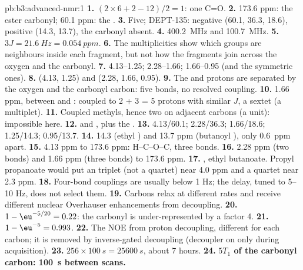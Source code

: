 \begin{solution}{pb:b3:advanced-nmr:1}
\textbf{1.} $(2 \times 6 + 2 - 12)/2 = 1$: one C=O.
\textbf{2.} 173.6 ppm: the ester carbonyl; 60.1 ppm: the .
\textbf{3.} Five; DEPT-135:  negative (60.1, 36.3, 18.6),  positive (14.3,
13.7), the carbonyl absent.
\textbf{4.} \qty{400.2}{MHz} and \qty{100.7}{MHz}.
\textbf{5.} $3J = \qty{21.6}{Hz} = \qty{0.054}{ppm}$.
\textbf{6.} The multiplicities show which groups are neighbours inside each
fragment, but not how the fragments join across the oxygen and the carbonyl.
\textbf{7.} 4.13--1.25; 2.28--1.66; 1.66--0.95 (and the symmetric ones).
\textbf{8.}  (4.13, 1.25) and  (2.28, 1.66, 0.95).
\textbf{9.} The  and  protons are separated by the oxygen and the
carbonyl carbon: five bonds, no resolved coupling.
\textbf{10.} 1.66 ppm, between  and : coupled to 2 + 3 = 5 protons with
similar $J$, a sextet (a multiplet).
\textbf{11.} Coupled methyls, hence two  on adjacent carbons (a  unit): impossible here.
\textbf{12.}  and , plus the .
\textbf{13.} 4.13/60.1; 2.28/36.3; 1.66/18.6; 1.25/14.3; 0.95/13.7.
\textbf{14.} 14.3 (ethyl ) and 13.7 ppm (butanoyl ), only \qty{0.6}{ppm} apart.
\textbf{15.} 4.13 ppm to 173.6 ppm: H--C--O--C, three bonds.
\textbf{16.} 2.28 ppm (two bonds) and 1.66 ppm (three bonds) to 173.6 ppm.
\textbf{17.} , ethyl butanoate. Propyl propanoate would put an
 triplet (not a quartet) near 4.0 ppm and a quartet near 2.3 ppm.
\textbf{18.} Four-bond couplings are usually below 1 Hz; the  delay, tuned to
5--10 Hz, does not select them.
\textbf{19.} Carbons relax at different rates and receive different nuclear
Overhauser enhancements from decoupling.
\textbf{20.} $1 - \eu^{-5/20} = 0.22$: the carbonyl is under-represented by a factor 4.
\textbf{21.} $1 - \eu^{-5} = 0.993$.
\textbf{22.} The NOE from proton decoupling, different for each carbon; it is removed
by inverse-gated decoupling (decoupler on only during acquisition).
\textbf{23.} $256 \times \qty{100}{s} = \qty{25600}{s}$, about 7 hours.
\textbf{24.} \textbf{$5T_1$ of the carbonyl carbon: \qty{100}{s} between scans.}
\end{solution}
